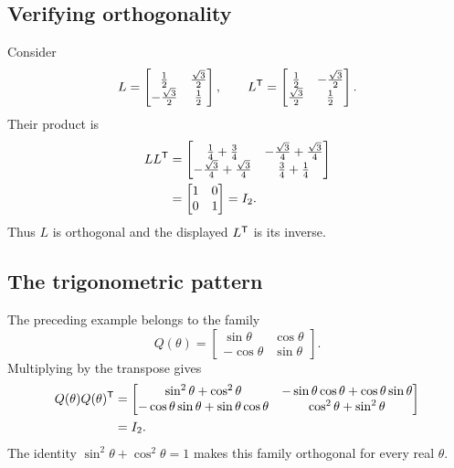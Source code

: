 \subsection{Verifying orthogonality}
Consider
\[
 L=\begin{bmatrix}
 \tfrac12&\tfrac{\sqrt3}{2}\\
 -\tfrac{\sqrt3}{2}&\tfrac12
 \end{bmatrix},
 \qquad
 L^{\mathsf T}=\begin{bmatrix}
 \tfrac12&-\tfrac{\sqrt3}{2}\\
 \tfrac{\sqrt3}{2}&\tfrac12
 \end{bmatrix}.
\]
Their product is
\begin{align}
 LL^{\mathsf T}
 &=\begin{bmatrix}
 \tfrac14+\tfrac34&-\tfrac{\sqrt3}{4}+\tfrac{\sqrt3}{4}\\
 -\tfrac{\sqrt3}{4}+\tfrac{\sqrt3}{4}&\tfrac34+\tfrac14
 \end{bmatrix}\\
 &=\begin{bmatrix}1&0\\0&1\end{bmatrix}=I_2.
\end{align}
Thus $L$ is orthogonal and the displayed $L^{\mathsf T}$ is its inverse.

\subsection{The trigonometric pattern}
The preceding example belongs to the family
\begin{equation}
 Q(\theta)=\begin{bmatrix}
 \sin\theta&\cos\theta\\
 -\cos\theta&\sin\theta
 \end{bmatrix}.
 \label{eq:l01-Q}
\end{equation}
Multiplying by the transpose gives
\begin{align*}
 Q(\theta)Q(\theta)^{\mathsf T}
 &=\begin{bmatrix}
 \sin^2\theta+\cos^2\theta & -\sin\theta\cos\theta+\cos\theta\sin\theta\\
 -\cos\theta\sin\theta+\sin\theta\cos\theta & \cos^2\theta+\sin^2\theta
 \end{bmatrix}\\
 &=I_2.
\end{align*}
The identity $\sin^2\theta+\cos^2\theta=1$ makes this family orthogonal for
every real $\theta$.

